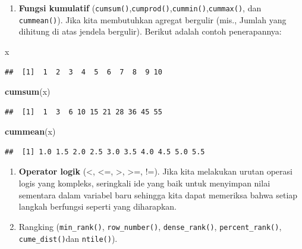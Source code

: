\documentclass[]{book}
\newenvironment{Shaded}{\begin{snugshade}}{\end{snugshade}}
\newcommand{\KeywordTok}[1]{\textcolor[rgb]{0.13,0.29,0.53}{\textbf{#1}}}
\newcommand{\NormalTok}[1]{#1}
\providecommand{\tightlist}{%
  \setlength{\itemsep}{0pt}\setlength{\parskip}{0pt}}
\begin{document}
\begin{enumerate}
\def\labelenumi{\arabic{enumi}.}
\setcounter{enumi}{3}
\tightlist
\item
  \textbf{Fungsi kumulatif}
  (\texttt{cumsum()},\texttt{cumprod()},\texttt{cummin()},\texttt{cummax()},
  dan \texttt{cummean()}). Jika kita membutuhkan agregat bergulir (mis.,
  Jumlah yang dihitung di atas jendela bergulir). Berikut adalah contoh
  penerapannya:
\end{enumerate}

\begin{Shaded}
\begin{Highlighting}[]
\NormalTok{x}
\end{Highlighting}
\end{Shaded}

\begin{verbatim}
##  [1]  1  2  3  4  5  6  7  8  9 10
\end{verbatim}

\begin{Shaded}
\begin{Highlighting}[]
\KeywordTok{cumsum}\NormalTok{(x)}
\end{Highlighting}
\end{Shaded}

\begin{verbatim}
##  [1]  1  3  6 10 15 21 28 36 45 55
\end{verbatim}

\begin{Shaded}
\begin{Highlighting}[]
\KeywordTok{cummean}\NormalTok{(x)}
\end{Highlighting}
\end{Shaded}

\begin{verbatim}
##  [1] 1.0 1.5 2.0 2.5 3.0 3.5 4.0 4.5 5.0 5.5
\end{verbatim}

\begin{enumerate}
\def\labelenumi{\arabic{enumi}.}
\setcounter{enumi}{4}
\item
  \textbf{Operator logik} (\textless{}, \textless{}=, \textgreater{},
  \textgreater{}=, !=). Jika kita melakukan urutan operasi logis yang
  kompleks, seringkali ide yang baik untuk menyimpan nilai sementara
  dalam variabel baru sehingga kita dapat memeriksa bahwa setiap langkah
  berfungsi seperti yang diharapkan.
\item
  Rangking (\texttt{min\_rank()}, \texttt{row\_number()},
  \texttt{dense\_rank()}, \texttt{percent\_rank()},
  \texttt{cume\_dist()}dan \texttt{ntile()}).
\end{enumerate}
\end{document}

